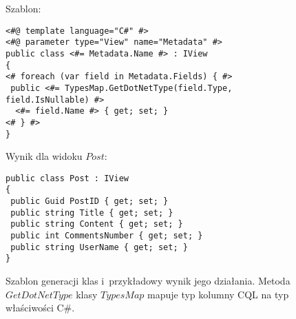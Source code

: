 \begin{figure}[!ht]
Szablon:

\begin{verbatim}
<#@ template language="C#" #>
<#@ parameter type="View" name="Metadata" #>
public class <#= Metadata.Name #> : IView
{
<# foreach (var field in Metadata.Fields) { #>
 public <#= TypesMap.GetDotNetType(field.Type, field.IsNullable) #>
  <#= field.Name #> { get; set; }
<# } #>
}
\end{verbatim}

Wynik dla widoku $Post$:

\begin{verbatim}
public class Post : IView
{
 public Guid PostID { get; set; }
 public string Title { get; set; }
 public string Content { get; set; }
 public int CommentsNumber { get; set; }
 public string UserName { get; set; }
}
\end{verbatim}

\caption{
 Szablon generacji klas i~przykładowy wynik jego działania.
 Metoda $GetDotNetType$ klasy $TypesMap$ mapuje typ kolumny CQL na typ właściwości C\#.}
\label{fig:single:template_class}
\end{figure}
